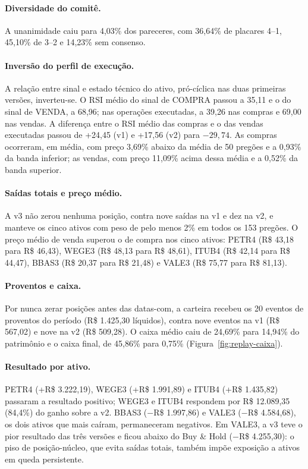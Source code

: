 \documentclass{eic-bcc-tcc}
\begin{document}
\paragraph{Diversidade do comitê.} A unanimidade caiu para 4,03\% dos pareceres, com 36,64\% de placares 4--1, 45,10\% de 3--2 e 14,23\% sem consenso.

\paragraph{Inversão do perfil de execução.} A relação entre sinal e estado técnico do ativo, pró-cíclica nas duas primeiras versões, inverteu-se. O RSI médio do sinal de COMPRA passou a 35,11 e o do sinal de VENDA, a 68,96; nas operações executadas, a 39,26 nas compras e 69,00 nas vendas. A diferença entre o RSI médio das compras e o das vendas executadas passou de +24,45 (v1) e +17,56 (v2) para $-29{,}74$. As compras ocorreram, em média, com preço 3,69\% abaixo da média de 50 pregões e a 0,93\% da banda inferior; as vendas, com preço 11,09\% acima dessa média e a 0,52\% da banda superior.

\paragraph{Saídas totais e preço médio.} A v3 não zerou nenhuma posição, contra nove saídas na v1 e dez na v2, e manteve os cinco ativos com peso de pelo menos 2\% em todos os 153 pregões. O preço médio de venda superou o de compra nos cinco ativos: PETR4 (R\$ 43,18 para R\$ 46,43), WEGE3 (R\$ 48,13 para R\$ 48,61), ITUB4 (R\$ 42,14 para R\$ 44,47), BBAS3 (R\$ 20,37 para R\$ 21,48) e VALE3 (R\$ 75,77 para R\$ 81,13).

\paragraph{Proventos e caixa.} Por nunca zerar posições antes das datas-com, a carteira recebeu os 20 eventos de proventos do período (R\$ 1.425,30 líquidos), contra nove eventos na v1 (R\$ 567,02) e nove na v2 (R\$ 509,28). O caixa médio caiu de 24,69\% para 14,94\% do patrimônio e o caixa final, de 45,86\% para 0,75\% (Figura~\ref{fig:replay-caixa}).

\paragraph{Resultado por ativo.} PETR4 (+R\$ 3.222,19), WEGE3 (+R\$ 1.991,89) e ITUB4 (+R\$ 1.435,82) passaram a resultado positivo; WEGE3 e ITUB4 respondem por R\$ 12.089,35 (84,4\%) do ganho sobre a v2. BBAS3 ($-$R\$ 1.997,86) e VALE3 ($-$R\$ 4.584,68), os dois ativos que mais caíram, permaneceram negativos. Em VALE3, a v3 teve o pior resultado das três versões e ficou abaixo do Buy \& Hold ($-$R\$ 4.255,30): o piso de posição-núcleo, que evita saídas totais, também impõe exposição a ativos em queda persistente.
\end{document}
